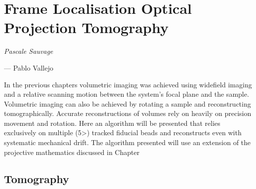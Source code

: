 \ifpdf
    \graphicspath{{Chapters/flopt/Figs/Raster/}{Chapters/flopt/Figs/PDF/}{Chapters/flopt/Figs/}}
\else
    \graphicspath{{Chapters/flopt/Figs/Vector/}{Chapters/flopt/Figs/}}
\fi

\chapter{Frame Localisation Optical Projection Tomography}\label{chapter:flopt}

\epigraph{\emph{Pascale Sauvage}}{--- Pablo Vallejo}

In the previous chapters volumetric imaging was achieved using widefield imaging and a relative scanning motion between the system's focal plane and the sample.
Volumetric imaging can also be achieved by rotating a sample and reconstructing tomographically.
Accurate reconstructions of volumes rely on heavily on precision movement and rotation.
Here an algorithm will be presented that relies exclusively on multiple (5>) tracked fiducial beads and reconstructs even with systematic mechanical drift.
The algorithm presented will use an extension of the projective mathematics discussed in Chapter %

\pagebreak

\section{Tomography}


